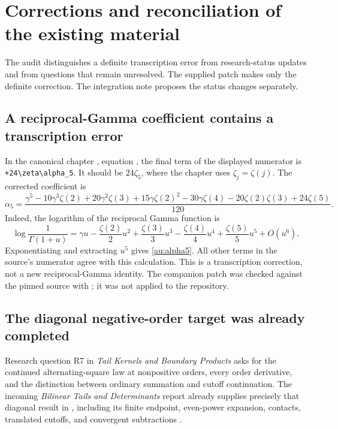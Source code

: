 \section{Corrections and reconciliation of the existing material}
\label{au:section}

The audit distinguishes a definite transcription error from research-status
updates and from questions that remain unresolved. The supplied patch makes
only the definite correction. The integration note proposes the status
changes separately.

\subsection{A reciprocal-Gamma coefficient contains a transcription error}

In the canonical chapter
, equation
, the final term of the displayed numerator is
\verb|+24\zeta\alpha_5|.
It should be \(24\zeta_5\), where the chapter uses
\(\zeta_j=\zeta(j)\). The corrected coefficient is
\begin{equation}\label{au:alpha5}
 \boxed{\displaystyle
 \alpha_5=
 \frac{\gamma^5-10\gamma^3\zeta(2)+20\gamma^2\zeta(3)
       +15\gamma\zeta(2)^2-30\gamma\zeta(4)
       -20\zeta(2)\zeta(3)+24\zeta(5)}{120}.}
\end{equation}
Indeed, the logarithm of the reciprocal Gamma function is
\[
 \log\frac1{\Gamma(1+u)}
   =\gamma u-\frac{\zeta(2)}2u^2+\frac{\zeta(3)}3u^3
          -\frac{\zeta(4)}4u^4+\frac{\zeta(5)}5u^5+O(u^6).
\]
Exponentiating and extracting \(u^5\) gives
\eqref{au:alpha5}. All other terms in the source's numerator agree with
this calculation. This is a transcription correction, not a new
reciprocal-Gamma identity. The companion patch was checked against the
pinned source with ; it was not applied to the
repository.

\subsection{The diagonal negative-order target was already completed}

Research question R7 in \emph{Tail Kernels and Boundary Products}
\cite{ProveItTailKernels} asks for the continued alternating-square law
at nonpositive orders, every order derivative, and the distinction between
ordinary summation and cutoff continuation. The incoming
\emph{Bilinear Tails and Determinants} report already supplies precisely
that diagonal result in
, including its finite endpoint,
even-power expansion, contacts, translated cutoffs, and convergent
subtractions \cite{ProveItBilinear}.

